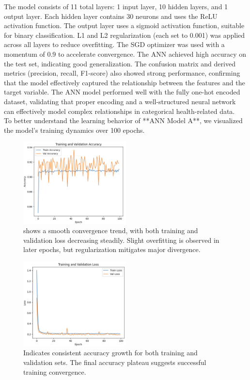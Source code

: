 \documentclass[conference]{IEEEtran}
\begin{document}
The model consists of 11 total layers: 1 input layer, 10 hidden layers, and 1 output layer. Each hidden layer contains 30 neurons and uses the ReLU activation function. The output layer uses a sigmoid activation function, suitable for binary classification. L1 and L2 regularization (each set to 0.001) was applied across all layers to reduce overfitting. The SGD optimizer was used with a momentum of 0.9 to accelerate convergence. The ANN achieved high accuracy on the test set, indicating good generalization. The confusion matrix and derived metrics (precision, recall, F1-score) also showed strong performance, confirming that the model effectively captured the relationship between the features and the target variable. The ANN model performed well with the fully one-hot encoded dataset, validating that proper encoding and a well-structured neural network can effectively model complex relationships in categorical health-related data.\\

To better understand the learning behavior of **ANN Model A**, we visualized the model’s training dynamics over 100 epochs.\\

\begin{figure}[H]
  \includegraphics[width=0.5\textwidth]{training_accuracy_ANN_A.png} %
  \caption {shows a smooth convergence trend, with both training and validation loss decreasing steadily. Slight overfitting is observed in later epochs, but regularization mitigates major divergence.}
  \label{fig:my_label}
\end{figure}

\begin{figure}[H]
  \includegraphics[width=0.5\textwidth]{training_loss_ANN_A.png} %
  \caption {Indicates consistent accuracy growth for both training and validation sets. The final accuracy plateau suggests successful training convergence.}
  \label{fig:my_label}
\end{figure}
\\
\end{document}
